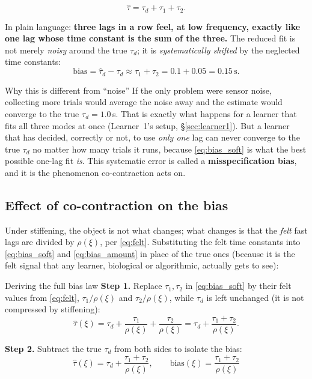 \documentclass[11pt,a4paper]{article}
\begin{document}
\begin{equation}
\hat\tau = \tau_d + \tau_1 + \tau_2.
\label{eq:bias_soft}
\end{equation}

In plain language: \textbf{three lags in a row feel, at low frequency, exactly
like one lag whose time constant is the sum of the three.} The reduced fit is
not merely \emph{noisy} around the true $\tau_d$; it is \emph{systematically
shifted} by the neglected time constants:
\begin{equation}
\mathrm{bias} = \hat\tau_d - \tau_d \approx \tau_1+\tau_2 = 0.1+0.05 = 0.15\,\text{s}.
\label{eq:bias_amount}
\end{equation}

\begin{examplebox}{Why this is different from ``noise''}
If the only problem were sensor noise, collecting more trials would average
the noise away and the estimate would converge to the true $\tau_d=1.0$\,s.
That is exactly what happens for a learner that fits all three modes at once
(Learner~1's setup, \S\ref{sec:learner1}). But a learner that has decided,
correctly or not, to use \emph{only one} lag can never converge to the true
$\tau_d$ no matter how many trials it runs, because \eqref{eq:bias_soft} is
what the best possible one-lag fit \emph{is}. This systematic error is called
a \textbf{misspecification bias}, and it is the phenomenon co-contraction acts
on.
\end{examplebox}

\subsection{Effect of co-contraction on the bias}

Under stiffening, the object is not what changes; what changes is that the
\emph{felt} fast lags are divided by $\rho(\xi)$, per \eqref{eq:felt}.
Substituting the felt time constants into \eqref{eq:bias_soft} and
\eqref{eq:bias_amount} in place of the true ones (because it is the felt
signal that any learner, biological or algorithmic, actually gets to see):

\begin{stepbox}{Deriving the full bias law}
\textbf{Step 1.} Replace $\tau_1,\tau_2$ in \eqref{eq:bias_soft} by their felt
values from \eqref{eq:felt}, $\tau_1/\rho(\xi)$ and $\tau_2/\rho(\xi)$, while
$\tau_d$ is left unchanged (it is not compressed by stiffening):
\[
\hat\tau(\xi) = \tau_d + \frac{\tau_1}{\rho(\xi)} + \frac{\tau_2}{\rho(\xi)}
= \tau_d + \frac{\tau_1+\tau_2}{\rho(\xi)}.
\]

\textbf{Step 2.} Subtract the true $\tau_d$ from both sides to isolate the
bias:
\begin{equation}
\boxed{\;
\hat\tau(\xi) = \tau_d + \frac{\tau_1+\tau_2}{\rho(\xi)},
\qquad
\mathrm{bias}(\xi) = \frac{\tau_1+\tau_2}{\rho(\xi)}
\;}
\label{eq:bias_law}
\end{equation}
\end{stepbox}
\end{document}
